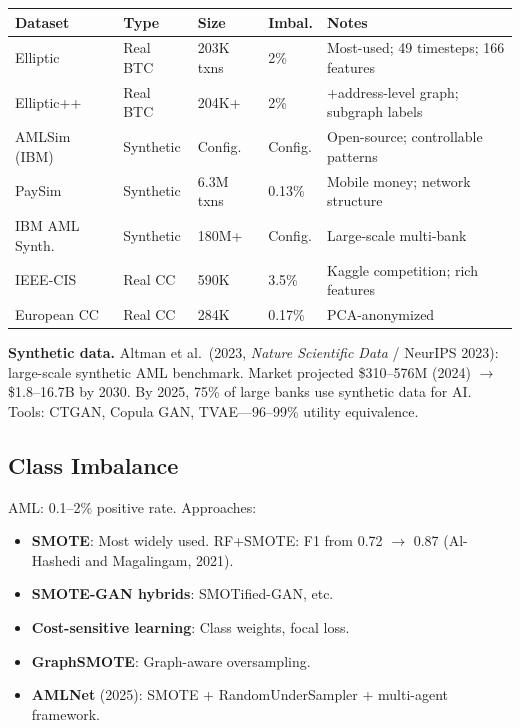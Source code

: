 \documentclass[11pt]{article}
\begin{document}
\begin{center}
\small
\begin{tabular}{p{2.8cm}lp{2.2cm}lp{3.5cm}}
\toprule
\textbf{Dataset} & \textbf{Type} & \textbf{Size} & \textbf{Imbal.} & \textbf{Notes} \\
\midrule
Elliptic & Real BTC & 203K txns & 2\% & Most-used; 49 timesteps; 166 features \\
Elliptic++ & Real BTC & 204K+ & 2\% & +address-level graph; subgraph labels \\
AMLSim (IBM) & Synthetic & Config. & Config. & Open-source; controllable patterns \\
PaySim & Synthetic & 6.3M txns & 0.13\% & Mobile money; network structure \\
IBM AML Synth. & Synthetic & 180M+ & Config. & Large-scale multi-bank \\
IEEE-CIS & Real CC & 590K & 3.5\% & Kaggle competition; rich features \\
European CC & Real CC & 284K & 0.17\% & PCA-anonymized \\
\bottomrule
\end{tabular}
\end{center}

\textbf{Synthetic data.} Altman et al.\ (2023, \textit{Nature Scientific Data} / NeurIPS 2023): large-scale synthetic AML benchmark. Market projected \$310--576M (2024) $\to$ \$1.8--16.7B by 2030. By 2025, 75\% of large banks use synthetic data for AI. Tools: CTGAN, Copula GAN, TVAE---96--99\% utility equivalence.

\subsection{Class Imbalance}

AML: 0.1--2\% positive rate. Approaches:
\begin{itemize}
\item \textbf{SMOTE}: Most widely used. RF+SMOTE: F1 from 0.72 $\to$ 0.87 (Al-Hashedi and Magalingam, 2021).
\item \textbf{SMOTE-GAN hybrids}: SMOTified-GAN, etc.
\item \textbf{Cost-sensitive learning}: Class weights, focal loss.
\item \textbf{GraphSMOTE}: Graph-aware oversampling.
\item \textbf{AMLNet} (2025): SMOTE + RandomUnderSampler + multi-agent framework.
\end{itemize}
\end{document}
